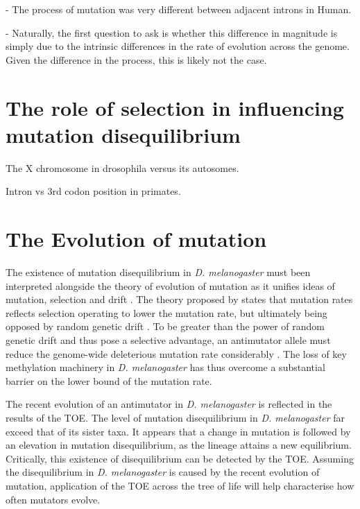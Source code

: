 - The process of mutation was very different between adjacent introns in Human. 

- Naturally, the first question to ask is whether this difference in magnitude is simply due to the intrinsic differences in the rate of evolution across the genome. Given the difference in the process, this is likely not the case. 

\section{The role of selection in influencing mutation disequilibrium}

The X chromosome in drosophila versus its autosomes. 

Intron vs 3rd codon position in primates. 

\section{The Evolution of mutation}

The existence of mutation disequilibrium in \textit{D. melanogaster} must been interpreted alongside the theory of evolution of mutation as it unifies ideas of mutation, selection and drift \citep{Lynch2008TheEvolution., Lynch2010EvolutionRate}. The theory proposed by \cite{Lynch2008TheEvolution.} states that mutation rates reflects selection operating to lower the mutation rate, but ultimately being opposed by random genetic drift \citep{Lynch2010EvolutionRate}. To be greater than the power of random genetic drift and thus pose a selective advantage, an antimutator allele must reduce the genome-wide deleterious mutation rate considerably \citep{Lynch2008TheEvolution., Lynch2010EvolutionRate}. The loss of key methylation machinery in \textit{D. melanogaster} has thus overcome a substantial barrier on the lower bound of the mutation rate. 

The recent evolution of an antimutator in \textit{D. melanogaster} is reflected in the results of the TOE. The level of mutation disequilibrium in \textit{D. melanogaster} far exceed that of its sister taxa. It appears that a change in mutation is followed by an elevation in mutation disequilibrium, as the lineage attains a new equilibrium. Critically, this existence of disequilibrium can be detected by the TOE. Assuming the disequilibrium in \textit{D. melanogaster} is caused by the recent evolution of mutation, application of the TOE across the tree of life will help characterise how often mutators evolve. 


